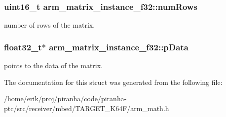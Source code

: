 \subsubsection[{\texorpdfstring{num\+Rows}{numRows}}]{\setlength{\rightskip}{0pt plus 5cm}uint16\+\_\+t arm\+\_\+matrix\+\_\+instance\+\_\+f32\+::num\+Rows}\hypertarget{structarm__matrix__instance__f32_a23f4e34d70a82c9cad7612add5640b7b}{}\label{structarm__matrix__instance__f32_a23f4e34d70a82c9cad7612add5640b7b}
number of rows of the matrix. 
\subsubsection[{\texorpdfstring{p\+Data}{pData}}]{\setlength{\rightskip}{0pt plus 5cm}float32\+\_\+t$\ast$ arm\+\_\+matrix\+\_\+instance\+\_\+f32\+::p\+Data}\hypertarget{structarm__matrix__instance__f32_af3917c032600a9dfd5ed4a96f074910a}{}\label{structarm__matrix__instance__f32_af3917c032600a9dfd5ed4a96f074910a}
points to the data of the matrix. 

The documentation for this struct was generated from the following file\+:\begin{DoxyCompactItemize}
\item 
/home/erik/proj/piranha/code/piranha-\/ptc/src/receiver/mbed/\+T\+A\+R\+G\+E\+T\+\_\+\+K64\+F/arm\+\_\+math.\+h\end{DoxyCompactItemize}
